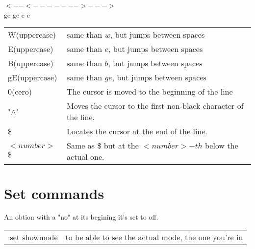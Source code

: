 \documentclass[11p]{book}
\begin{document}
\hspace*{4.2cm}$<--<---$ \hspace*{1cm } $---->--->$ \\
\hspace*{5.2cm} ge \hspace*{0.6cm} ge  \hspace*{2cm} e \hspace*{1cm} e\\


\begin{tabular}{p{2cm} p{13cm}}
W(uppercase) & same than $w$, but jumps between spaces \\
E(uppercase) & same than $e$, but jumps between spaces \\
B(uppercase) & same than $b$, but jumps between spaces \\
gE(uppercase) & same than $ge$, but jumps between spaces \\
\hline
0(cero) & The cursor is moved to the beginning of the line \\
"$\wedge$" & Moves the cursor to the first non-black character of the line. \\
\$ & Locates the cursor at the end of the line. \\ 
$<number>$\$ & Same as \$ but at the $<number>-th$ below the actual one.\\

\end{tabular}

\newpage
\section*{Set commands}
An obtion with a "no" at its begining it's set to off. \\

\begin{tabular}{p{4cm} l}
:set showmode & to be able to see the actual mode, the one you're in \\

\end{tabular}
\end{document}
